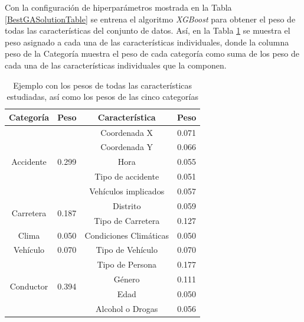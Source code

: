 
Con la configuración de hiperparámetros mostrada en la Tabla \ref{BestGASolutionTable} se entrena el algoritmo \textit{XGBoost} para obtener el peso de todas las  características del conjunto de datos. Así, en la Tabla \ref{1stPaperWeightsFinalCharacteristics} se muestra el peso asignado a cada una de las características individuales, donde la columna peso de la Categoría muestra el peso de cada categoría como suma de los peso de cada una de las características individuales que la componen.


\begin{table}[ht]
	\centering
	\begin{tabular}{ |c|c||c|c| }
		\hline
		\textbf{Categoría} & \textbf{Peso} & \textbf{Característica} & \textbf{Peso}\\
		\hline
		\hline
		\multirow{5}{*}{Accidente}   & \multirow{5}{*}{0.299} & Coordenada X & 0.071\\
		&  & Coordenada Y  & 0.066\\
		&  & Hora & 0.055\\
		&  & Tipo de accidente  & 0.051\\
		&  & Vehículos implicados & 0.057\\
		\hline
		
		\multirow{2}{*}{Carretera} & \multirow{2}{*}{0.187} & Distrito  & 0.059\\      
		&  & Tipo de Carretera & 0.127\\
		\hline
		
		\multirow{1}{*}{Clima}  & \multirow{1}{*}{0.050}  & Condiciones Climáticas  & 0.050\\
		\hline
		
		\multirow{1}{*}{Vehículo}  & \multirow{1}{*}{0.070} & Tipo de Vehículo  & 0.070\\
		\hline
		
		\multirow{4}{*}{Conductor}   & \multirow{4}{*}{0.394} & Tipo de Persona & 0.177\\
		&      & Género      & 0.111\\
		&      & Edad      & 0.050\\
		&      & Alcohol o Drogas  & 0.056\\
		\hline
		
	\end{tabular}
	\caption{Ejemplo con los pesos de todas las características estudiadas, así como los pesos de las cinco categorías}
	\label{1stPaperWeightsFinalCharacteristics}
\end{table}

